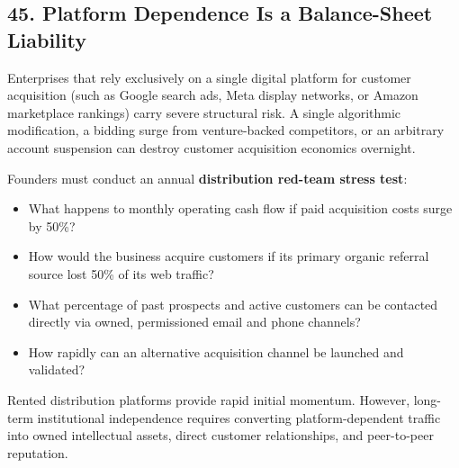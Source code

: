 \subsection*{45. Platform Dependence Is a Balance-Sheet Liability}

Enterprises that rely exclusively on a single digital platform for customer acquisition (such as Google search ads, Meta display networks, or Amazon marketplace rankings) carry severe structural risk. A single algorithmic modification, a bidding surge from venture-backed competitors, or an arbitrary account suspension can destroy customer acquisition economics overnight.

Founders must conduct an annual \textbf{distribution red-team stress test}:
\begin{itemize}[leftmargin=*,itemsep=1pt]
  \item What happens to monthly operating cash flow if paid acquisition costs surge by 50\%?
  \item How would the business acquire customers if its primary organic referral source lost 50\% of its web traffic?
  \item What percentage of past prospects and active customers can be contacted directly via owned, permissioned email and phone channels?
  \item How rapidly can an alternative acquisition channel be launched and validated?
\end{itemize}

Rented distribution platforms provide rapid initial momentum. However, long-term institutional independence requires converting platform-dependent traffic into owned intellectual assets, direct customer relationships, and peer-to-peer reputation.
